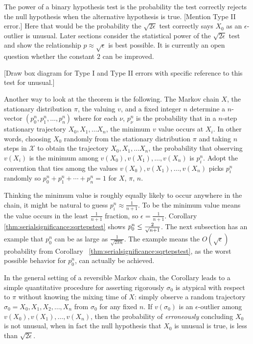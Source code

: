 \documentclass[12pt]{article}
\begin{document}
\begin{remark}
    The power%
    of a binary hypothesis test is the probability the test correctly
    rejects the null hypothesis when the alternative hypothesis is
    true. [Mention Type II error.]
    Here that would be the probability the \( \sqrt{2\epsilon} \) test
    correctly says \( X_0 \) as an \( \epsilon \)-outlier is unusual.
    Later sections consider the
    statistical power of the \( \sqrt{2\epsilon} \) test and show the
    relationship \( p \approx \sqrt{\epsilon} \) is best possible.  It
    is currently an open question whether the constant \( 2 \) can be
    improved.
\end{remark}

[Draw box diagram for Type I and Type II errors with specific reference
to this test for unusual.]


Another way to look at the theorem is the following.  The Markov chain \(
X \), the stationary distribution \( \pi \), the valuing \( v \),
and a fixed integer \( n \) determine a \( n \)-vector \( (p_0^n, p_1^n,
\dots, p_n^n) \) where for each \( \nu \), \( p_{\nu}^n \) is the
probability that in a \( n \)-step stationary trajectory \( X_0, X_1,
\dots X_n \), the minimum \( v \) value occurs at \( X_i \).  In other
words, choosing \( X_0 \) randomly from the stationary distribution \(
\pi \) and taking \( n \) steps in \( \mathcal{X} \) to obtain the
trajectory \( X_0, X_1, \dots X_n \), the probability that observing \(
v(X_i) \) is the minimum among \( v(X_0), v(X_1), \dots, v(X_n) \) is \(
p_i^n \).  Adopt the convention that ties among the values \( v (X_0), v
(X_1), \dots, v(X_n) \) picks \( p_i^n \) randomly so \( p_0^n + p_1^n +
\cdots + p_n^n = 1 \) for \( X \), \( \pi \), \( n \).

Thinking the minimum value is roughly equally likely to occur anywhere
in the chain, it might be natural to guess \( p_i^n \approx \frac{1}{n+1}
\).  To be the minimum value means the value occurs in the least \(
\frac{1}{n+1} \) fraction, so \( \epsilon = \frac {1}{n+1} \).
Corollary~%
\ref{thm:serialsignificance:sqrtepstest} shows \( p_0^n \le \frac{2}{\sqrt {%
n+1}} \).  The next subsection has an example that \( p_0^n \) can be as
large as \( \frac{1}{\sqrt{2\pi n}} \).  The example means the \( O (\sqrt
{\epsilon}) \) probability from Corollary~%
\ref{thm:serialsignificance:sqrtepstest}, as the worst possible behavior for \(
p_0^n \), can actually be achieved.

In the general setting of a reversible Markov chain, the Corollary leads
to a simple quantitative procedure for asserting rigorously \( \sigma_0 \)
is atypical with respect to \( \pi \) without knowing the mixing time of
\( X \):  simply observe a random trajectory \( \sigma_0 = X_0 , X_1, X_2,
\dots, X_n \) from \( \sigma_0 \) for any fixed \( n \). If \( v(\sigma_0
) \) is an \( \epsilon \)-outlier among \( v(X_0), v(X_1), \dots, v(X_n)
\), then the probability of \emph{erroneously} concluding \( X_0 \) is
not unusual, when in fact the null
hypothesis that \( X_0 \) is unusual is
true, is less than \( \sqrt{2 \epsilon } \).
\end{document}
